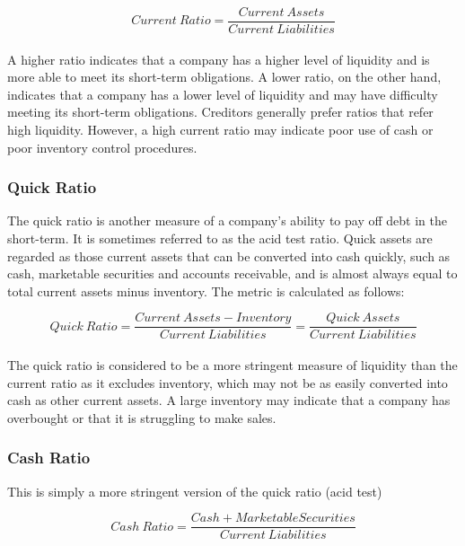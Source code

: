 \documentclass{article}
\begin{document}
 \begin{equation}
    Current\: Ratio = \frac{Current\: Assets}{Current\: Liabilities}
\end{equation}\\

A higher ratio indicates that a company has a higher level of liquidity and is more able to meet its short-term obligations. A lower ratio, on the other hand, indicates that a company has a lower level of liquidity and may have difficulty meeting its short-term obligations. Creditors generally prefer ratios that refer high liquidity. However, a high current ratio may indicate poor use of cash or poor inventory control procedures. 

\subsubsection{Quick Ratio}
The quick ratio is another measure of a company's ability to pay off debt in the short-term. It is sometimes referred to as the acid test ratio. Quick assets are regarded as those current assets that can be converted into cash quickly, such as cash, marketable securities and accounts receivable, and is almost always equal to total current assets minus inventory. The metric is calculated as follows:

 \begin{equation}
    Quick\: Ratio = \frac{Current\: Assets - Inventory}{Current\: Liabilities} = \frac{Quick\: Assets}{Current\: Liabilities}
\end{equation}\\

The quick ratio is considered to be a more stringent measure of liquidity than the current ratio as it excludes inventory, which may not be as easily converted into cash as other current assets. A large inventory may indicate that a company has overbought or that it is struggling to make sales. 

\subsubsection{Cash Ratio}
This is simply a more stringent version of the quick ratio (acid test)

\begin{equation}
    Cash\: Ratio = \frac{Cash + Marketable Securities}{Current\: Liabilities} 
\end{equation}\\
\end{document}
